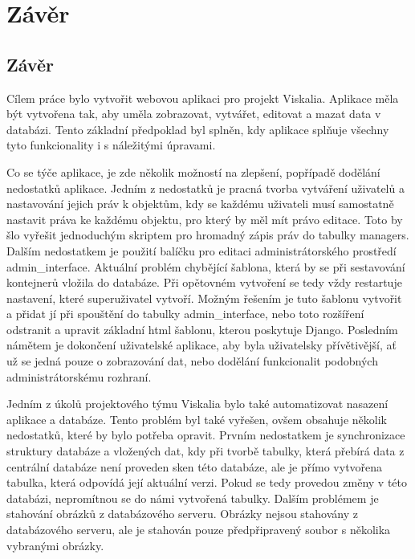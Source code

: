 \chapter{Závěr}
\label{5-zaver}

\section{Závěr}

Cílem práce bylo vytvořit webovou aplikaci pro projekt Viskalia. Aplikace měla být vytvořena tak, aby uměla zobrazovat, vytvářet, editovat a mazat data v databázi. Tento základní předpoklad byl splněn, kdy aplikace splňuje všechny tyto funkcionality i s náležitými úpravami.

Co se týče aplikace, je zde několik možností na zlepšení, popřípadě dodělání nedostatků aplikace. Jedním z nedostatků je pracná tvorba vytváření uživatelů a nastavování jejich práv k objektům, kdy se každému uživateli musí samostatně nastavit práva ke každému objektu, pro který by měl mít právo editace. Toto by šlo vyřešit jednoduchým skriptem pro hromadný zápis práv do tabulky managers. Dalším nedostatkem je použití balíčku pro editaci administrátorského prostředí admin\_interface. Aktuální problém chybějící šablona, která by se při sestavování kontejnerů vložila do databáze. Při opětovném vytvoření se tedy vždy restartuje nastavení, které superuživatel vytvoří. Možným řešením je tuto šablonu vytvořit a přidat jí při spouštění do tabulky admin\_interface, nebo toto rozšíření odstranit a upravit základní html šablonu, kterou poskytuje Django. Posledním námětem je dokončení uživatelské aplikace, aby byla uživatelsky přívětivější, ať už se jedná pouze o zobrazování dat, nebo dodělání funkcionalit podobných administrátorskému rozhraní.

Jedním z úkolů projektového týmu Viskalia bylo také automatizovat nasazení aplikace a databáze. Tento problém byl také vyřešen, ovšem obsahuje několik nedostatků, které by bylo potřeba opravit. Prvním nedostatkem je synchronizace struktury databáze a vložených dat, kdy při tvorbě tabulky, která přebírá data z centrální databáze není proveden sken této databáze, ale je přímo vytvořena tabulka, která odpovídá její aktuální verzi. Pokud se tedy provedou změny v této databázi, nepromítnou se do námi vytvořená tabulky. Dalším problémem je stahování obrázků z databázového serveru. Obrázky nejsou stahovány z databázového serveru, ale je stahován pouze předpřipravený soubor s několika vybranými obrázky.